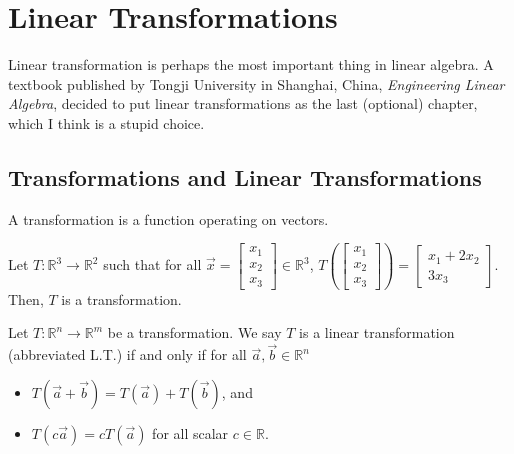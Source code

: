 \documentclass[]{book}
\newcommand{\vecxxx}[1][x]{\ensuremath{\begin{bmatrix}
#1_1 \\
#1_2 \\
#1_3
\end{bmatrix}}}
\begin{document}
\chapter{Linear Transformations}
Linear transformation is perhaps the most important thing in linear algebra. A textbook published by Tongji University in Shanghai, China, \textit{Engineering Linear Algebra}, decided to put linear transformations as the last (optional) chapter, which I think is a stupid choice. 
\section{Transformations and Linear Transformations}
\begin{definition}[transformation]
    A transformation is a function operating on vectors.
\end{definition}
\begin{example}
    Let $T:\mathbb{R}^3 \to \mathbb{R}^2$ such that for all $\vec{x}=\vecxxx \in \mathbb{R}^3$, $T\left(\vecxxx\right) = \begin{bmatrix}x_1 + 2x_2 \\ 3x_3\end{bmatrix}$. Then, $T$ is a transformation. \hfill \qedsymbol
\end{example}
\begin{definition}
    Let $T:\mathbb{R}^n \to \mathbb{R}^m$ be a transformation. We say $T$ is a linear transformation (abbreviated L.T.) if and only if for all $\vec{a},\vec{b} \in \mathbb{R}^n$
    \begin{itemize}
        \item $T(\vec{a}+\vec{b}) = T(\vec{a}) + T(\vec{b})$, and
        \item $T(c\vec{a}) = cT(\vec{a})$ for all scalar $c \in \mathbb{R}$.
    \end{itemize}
\end{definition}
\end{document}
